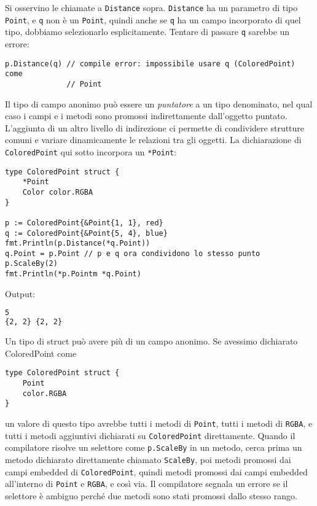 \documentclass[../../thesis.tex]{subfiles}
\begin{document}
    Si osservino le chiamate a \verb"Distance" sopra. \verb"Distance" ha un parametro di tipo \verb"Point", e \verb"q" non è un \verb"Point", quindi anche se \verb"q" ha un campo incorporato di quel tipo, dobbiamo selezionarlo esplicitamente.
    Tentare di passare \verb"q" sarebbe un errore:
    \begin{lstlisting}[frame = single,label={lst:lstlisting5-3.4}]
p.Distance(q) // compile error: impossibile usare q (ColoredPoint) come
              // Point
    \end{lstlisting}
    Il tipo di campo anonimo può essere un \textit{puntatore} a un tipo denominato, nel qual caso i campi e i metodi sono promossi indirettamente dall'oggetto puntato.
    L'aggiunta di un altro livello di indirezione ci permette di condividere strutture comuni e variare dinamicamente le relazioni tra gli oggetti.
    La dichiarazione di \verb"ColoredPoint" qui sotto incorpora un \verb"*Point":
    \begin{lstlisting}[frame = single,label={lst:lstlisting5-3.5}]
type ColoredPoint struct {
    *Point
    Color color.RGBA
}

p := ColoredPoint{&Point{1, 1}, red}
q := ColoredPoint{&Point{5, 4}, blue}
fmt.Println(p.Distance(*q.Point))
q.Point = p.Point // p e q ora condividono lo stesso punto
p.ScaleBy(2)
fmt.Println(*p.Pointm *q.Point)
    \end{lstlisting}
    Output:
    \begin{lstlisting}[language = bash, frame = L,label={lst:lstlisting5-3.6}]
5
{2, 2} {2, 2}
    \end{lstlisting}
    Un tipo di struct può avere più di un campo anonimo.
    Se avessimo dichiarato ColoredPoint come
    \begin{lstlisting}[frame = single,label={lst:lstlisting5-3.7}]
type ColoredPoint struct {
    Point
    color.RGBA
}
    \end{lstlisting}
    un valore di questo tipo avrebbe tutti i metodi di \verb"Point", tutti i metodi di \verb"RGBA", e tutti i metodi aggiuntivi dichiarati su \verb"ColoredPoint" direttamente.
    Quando il compilatore risolve un selettore come \verb"p.ScaleBy" in un metodo, cerca prima un metodo dichiarato direttamente chiamato \verb"ScaleBy", poi metodi promossi dai campi embedded di \verb"ColoredPoint", quindi metodi promossi dai campi embedded all'interno di \verb"Point" e \verb"RGBA", e così via.
    Il compilatore segnala un errore se il selettore è ambiguo perché due metodi sono stati promossi dallo stesso rango.
    \hfill \vspace{12pt}
\end{document}
